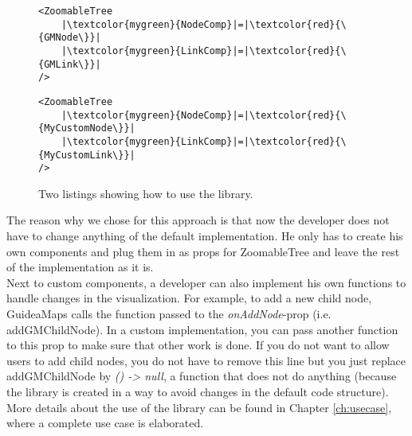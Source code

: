 \begin{figure}[H]
	\begin{minipage}{0.5\textwidth}
 		 \centering
		 \begin{verbatim}
<ZoomableTree
    |\textcolor{mygreen}{NodeComp}|=|\textcolor{red}{\{GMNode\}}|
    |\textcolor{mygreen}{LinkComp}|=|\textcolor{red}{\{GMLink\}}|
/>
		\end{verbatim}
		\label{lst:default-components}
	\end{minipage}
 	\begin{minipage}{0.5\textwidth}
  		\centering
  		\begin{verbatim}
<ZoomableTree
    |\textcolor{mygreen}{NodeComp}|=|\textcolor{red}{\{MyCustomNode\}}|
    |\textcolor{mygreen}{LinkComp}|=|\textcolor{red}{\{MyCustomLink\}}|
/>
		\end{verbatim}
		\label{lst:custom-components}
 	\end{minipage}
	\caption{Two listings showing how to use the library.}
	\label{fig:examplecode-library}
\end{figure}

The reason why we chose for this approach is that now the developer does not have to change anything of the default implementation. He only has to create his own components and plug them in as props for ZoomableTree and leave the rest of the implementation as it is.\\

Next to custom components, a developer can also implement his own functions to handle changes in the visualization. For example, to add a new child node, GuideaMaps calls the function passed to the \textit{onAddNode}-prop (i.e. addGMChildNode). In a custom implementation, you can pass another function to this prop to make sure that other work is done. If you do not want to allow users to add child nodes, you do not have to remove this line but you just replace addGMChildNode by \textit{() -> null}, a function that does not do anything (because the library is created in a way to avoid changes in the default code structure). More details about the use of the library can be found in Chapter \ref{ch:usecase}, where a complete use case is elaborated.



